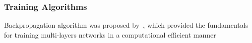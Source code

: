 \subsubsection{Training Algorithms}
Backpropagation algorithm was proposed by~\citet{werbos1975beyond}, which provided the fundamentals for training multi-layers networks in a computational efficient manner